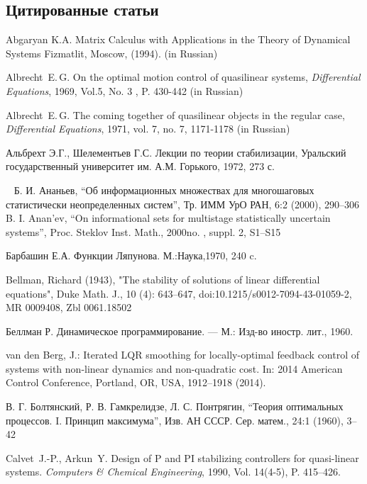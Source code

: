\documentclass[../main.tex]{subfiles}
\begin{document}
\clearpage
\begin{thebibliography}{99}

\subsection*{Цитированные статьи}

Abgaryan K.A. Matrix Calculus with Applications in the Theory of Dynamical Systems Fizmatlit, Moscow, (1994). (in Russian)

Albrecht~E.\,G. On the optimal motion control of quasilinear systems, \emph{Differential Equations}, 1969, Vol.5, No. 3 , P. 430-442 (in Russian)

Albrecht~E.\,G. The coming together of quasilinear objects in the regular case, \emph{Differential Equations}, 1971, vol. 7, no. 7, 1171-1178 (in Russian)

Альбрехт Э.Г., Шелементьев Г.С. Лекции по теории стабилизации, Уральский государственный университет им. А.М. Горького, 1972, 273 с.

Б. И. Ананьев, “Об информационных множествах для многошаговых статистически неопределенных систем”, Тр. ИММ УрО РАН, 6:2 (2000),  290–306  B. I. Anan'ev, “On informational sets for multistage statistically uncertain systems”, Proc. Steklov Inst. Math., 2000no. , suppl. 2, S1–S15


Барбашин Е.А. Функции Ляпунова. М.:Наука,1970, 240 c.

Bellman, Richard (1943), "The stability of solutions of linear differential equations", Duke Math. J., 10 (4): 643–647, doi:10.1215/s0012-7094-43-01059-2, MR 0009408, Zbl 0061.18502


Беллман Р. Динамическое программирование. — М.: Изд-во иностр. лит., 1960.

van den Berg, J.: Iterated LQR smoothing for locally-optimal feedback control of systems with non-linear dynamics and non-quadratic cost. In: 2014 American Control Conference, Portland, OR, USA, 1912--1918 (2014). 

В. Г. Болтянский, Р. В. Гамкрелидзе, Л. С. Понтрягин, “Теория оптимальных процессов. I. Принцип максимума”, Изв. АН СССР. Сер. матем., 24:1 (1960),  3–42

Calvet~J.-P., Arkun~Y. Design of P and PI stabilizing controllers for quasi-linear systems. \emph{Computers \& Chemical Engineering}, 1990, Vol. 14(4-5), P. 415–426. 


\end{thebibliography}
\end{document}
